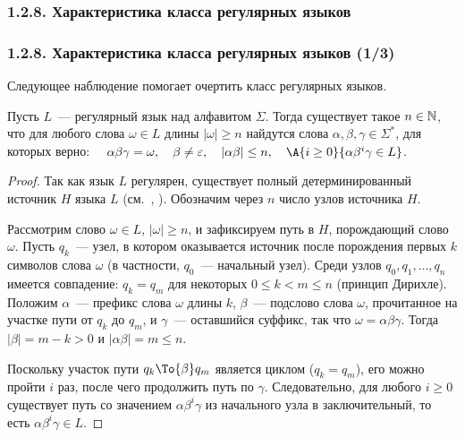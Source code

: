 \subsubsection{1.2.8. Характеристика класса регулярных языков}\label{1.2.8.}
\begin{frame}
\frametitle{1.2.8. Характеристика класса регулярных языков (1/3) }
Следующее наблюдение помогает очертить класс регулярных языков. 

\begin{lemma} {\NB{[о разрастании]}}
Пусть $L$~--- регулярный язык над алфавитом $\Sigma$.
Тогда существует такое $n\in \Bbb{N}$, что для любого слова $\omega\in L$
длины $|\omega|\ge n$ найдутся слова $\alpha,\beta,\gamma\in\Sigma^*$, 
для которых верно:
$\quad
\alpha\beta\gamma=\omega,\quad \beta\ne\varepsilon,\quad |\alpha\beta|\le n,\quad
\A{i\ge 0}{\alpha \beta^i \gamma\in L} 
$.
\end{lemma}


\begin{proof}
Так как язык $L$ регулярен, существует полный детерминированный источник
$H$ языка $L$ (см.~, ). Обозначим через $n$ число узлов
источника $H$.

Рассмотрим слово $\omega\in L$, $|\omega|\ge n$, и зафиксируем путь в $H$,
порождающий слово $\omega$.
Пусть $q_k$~--- узел, в котором оказывается источник после порождения первых $k$
символов слова $\omega$ (в частности, $q_0$~--- начальный узел).
Среди узлов $q_0,q_1,\dots,q_n$ имеется совпадение:
$q_k=q_m$ для некоторых $0\le k < m \le n$ (принцип Дирихле).
Положим
$\alpha$~--- префикс слова $\omega$ длины $k$,
$\beta$~--- подслово слова $\omega$, прочитанное на участке пути от $q_k$ до $q_m$,
и $\gamma$~--- оставшийся суффикс, так что $\omega=\alpha\beta\gamma$.
Тогда $|\beta|=m-k>0$ и $|\alpha\beta|= m \le n$.

Поскольку участок пути $q_k\To{\beta}q_m$ является циклом ($q_k=q_m$),
его можно пройти $i$ раз, после чего продолжить путь по $\gamma$.
Следовательно, для любого $i\ge 0$ существует путь со значением $\alpha\beta^i\gamma$
из начального узла в заключительный, то есть $\alpha\beta^i\gamma\in L$.
\end{proof}

\end{frame}

